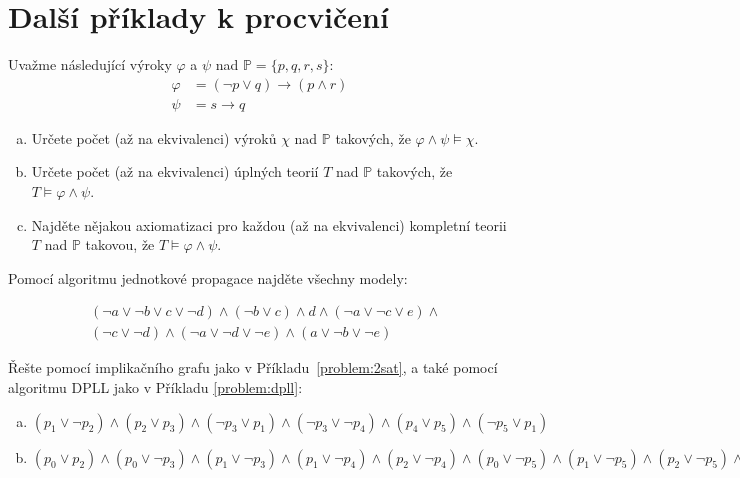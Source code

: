     
\section*{Další příklady k procvičení}
    

\begin{problem}

    Uvažme následující výroky $\varphi$ a $\psi$ nad $\mathbb P=\{p, q, r, s\}$:
    \begin{align*}
        \varphi &= (\neg p \vee  q)\to(p\wedge r)\\
        \psi &= s\to q
    \end{align*}
    \begin{enumerate}[(a)]
        \item Určete počet (až na ekvivalenci) výroků $\chi$ nad $\mathbb P$ takových, že $\varphi\wedge\psi\models\chi$.
        \item Určete počet (až na ekvivalenci) úplných teorií $T$ nad $\mathbb P$ takových, že $T\models\varphi\wedge\psi$.
        \item Najděte nějakou axiomatizaci pro každou (až na ekvivalenci) kompletní teorii $T$ nad $\mathbb P$ takovou, že $T\models\varphi\wedge\psi$.
    \end{enumerate}

\end{problem}


\begin{problem} 
    
    Pomocí algoritmu jednotkové propagace najděte všechny modely:

    \begin{align*}
    &(\neg a \vee \neg b \vee c \vee \neg d)\wedge(\neg b \vee c)\wedge d \wedge (\neg a \vee \neg c \vee e)\wedge \\
    &(\neg c \vee \neg d)\wedge(\neg a \vee \neg d \vee \neg e)\wedge(a\vee \neg b \vee\neg e)
    \end{align*}

\end{problem}

    
\begin{problem} 
    
    Řešte pomocí implikačního grafu jako v Příkladu~\ref{problem:2sat}, a také pomocí algoritmu DPLL jako v Příkladu \ref{problem:dpll}:
    \begin{enumerate}[(a)]
        \item $(p_1\vee \neg p_2)\wedge (p_2\vee p_3)\wedge (\neg p_3\vee p_1)\wedge (\neg p_3\vee \neg p_4)\wedge (p_4\vee p_5)\wedge (\neg p_5\vee p_1)$
        \item $(p_0 \vee  p_2) \wedge  (p_0 \vee  \neg p_3) \wedge  (p_1 \vee  \neg p_3) 
        \wedge  (p_1 \vee  \neg p_4) \wedge  (p_2 \vee  \neg p_4) 
        \wedge  (p_0 \vee  \neg p_5)
        \wedge 
        (p_1 \vee  \neg p_5) \wedge  (p_2 \vee  \neg p_5) \wedge  (\neg p_1 \vee  \neg p_6) \wedge  (p_4 \vee  p_6) \wedge  (p_5 \vee  p_6) \wedge  p_1\wedge \neg p_7$
    \end{enumerate}

\end{problem}


